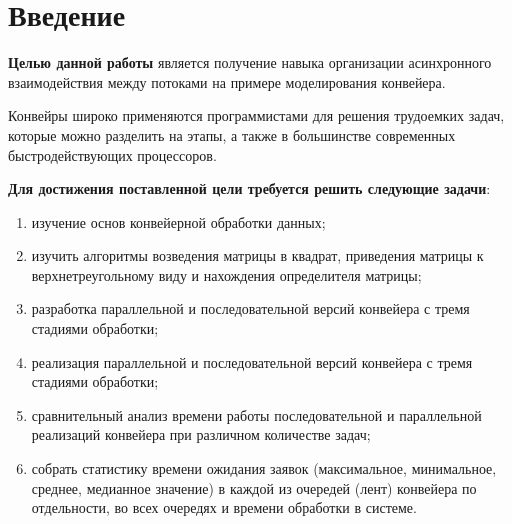\chapter*{Введение}
\textbf{Целью данной работы} является получение навыка организации асинхронного взаимодействия между потоками на примере моделирования конвейера.

Конвейры широко применяются программистами для решения трудоемких задач, которые можно разделить на этапы, а также в большинстве современных быстродействующих процессоров.

\textbf{Для достижения поставленной цели требуется решить следующие задачи}:
\begin{enumerate}[label={\arabic*)}]
	\item изучение основ конвейерной обработки данных;
	\item изучить алгоритмы возведения матрицы в квадрат, приведения матрицы к верхнетреугольному виду и нахождения определителя матрицы;
        \item разработка параллельной и последовательной версий конвейера с тремя стадиями обработки;
        \item реализация параллельной и последовательной версий конвейера с тремя стадиями обработки;
        \item сравнительный анализ времени работы последовательной и параллельной реализаций конвейера при различном количестве задач;
        \item собрать статистику времени ожидания заявок (максимальное, минимальное, среднее, медианное значение) в каждой из очередей (лент) конвейера по отдельности, во всех очередях и времени обработки в системе.
\end{enumerate}
